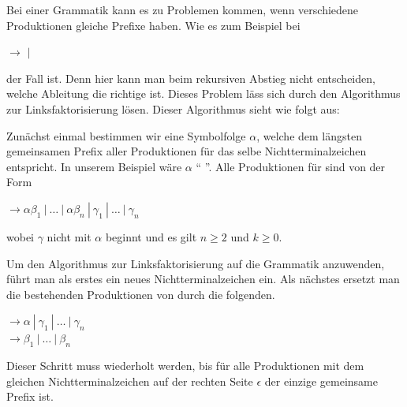 Bei einer Grammatik kann es zu Problemen kommen, wenn verschiedene Produktionen
gleiche Prefixe haben. Wie es zum Beispiel bei \vspace{10pt}

\noindent
{}$ \to$   
   $|$ 
   
\vspace{10pt}

\noindent der Fall ist. Denn hier kann man beim rekursiven Abstieg nicht
entscheiden, welche Ableitung die richtige ist. Dieses Problem läss sich durch
den Algorithmus zur Linksfaktorisierung lösen. Dieser Algorithmus sieht wie folgt
aus:\vspace{10pt}

Zunächst einmal bestimmen wir eine Symbolfolge $\alpha$, welche dem längsten
gemeinsamen Prefix aller Produktionen für das selbe Nichtterminalzeichen
 entspricht. In unserem Beispiel wäre $\alpha$ 
"`  
"'. Alle Produktionen für  sind von der
Form\vspace{10pt}

\noindent
{}$ \to \alpha \beta_1\ |\ \ldots\ |\ \alpha
\beta_n\ |\ \gamma_1\ |\ \ldots\ |\ \gamma_n$
\vspace{10pt}

\noindent
wobei $\gamma$ nicht mit $\alpha$ beginnt und es gilt $n \geq 2$ und $k \geq 0$.
\vspace{10pt}

Um den Algorithmus zur Linksfaktorisierung auf die Grammatik anzuwenden, führt
man als erstes ein neues Nichtterminalzeichen  ein. Als
nächstes ersetzt man die bestehenden Produktionen von 
durch die folgenden.\vspace{10pt}

\noindent
{}$ \to \alpha $$\ |\ \gamma_1\ |\ \ldots\ |\ \gamma_n$\\
$ \to \beta_1\ |\ \ldots\ |\ \beta_n$
\vspace{10pt}

\noindent
Dieser Schritt muss wiederholt werden, bis für alle Produktionen mit dem
glei\-chen Nichtterminalzeichen auf der rechten Seite $\epsilon$ der einzige
gemeinsame Prefix ist.\vspace{10pt}

